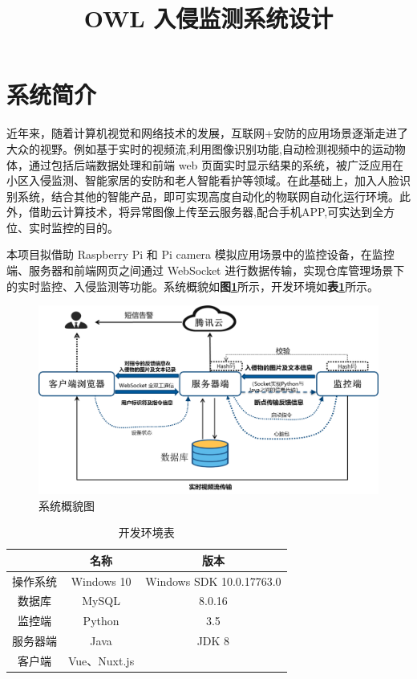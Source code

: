 \documentclass[article]{BJTU-thesis}
\title{OWL 入侵监测系统设计}
\begin{document}
	\makecover
	
	\tableofcontents
	\newpage

	\newpage
	\setcounter{page}{1}
	\section{系统简介}
	近年来，随着计算机视觉和网络技术的发展，互联网+安防的应用场景逐渐走进了大众的视野。例如基于实时的视频流,利用图像识别功能,自动检测视频中的运动物体，通过包括后端数据处理和前端 web 页面实时显示结果的系统，被广泛应用在小区入侵监测、智能家居的安防和老人智能看护等领域。在此基础上，加入人脸识别系统，结合其他的智能产品，即可实现高度自动化的物联网自动化运行环境。此外，借助云计算技术，将异常图像上传至云服务器,配合手机APP,可实达到全方位、实时监控的目的。
	
	本项目拟借助 Raspberry Pi 和 Pi camera 模拟应用场景中的监控设备，在监控端、服务器和前端网页之间通过 WebSocket 进行数据传输，实现仓库管理场景下的实时监控、入侵监测等功能。系统概貌如\textbf{图\ref{fig:fig1}}所示，开发环境如\textbf{表\ref{tab:tab1}}所示。
	
	\begin{figure}[!htb]
		\centering
		\includegraphics[scale=0.6]{img/1.png}
		\caption{系统概貌图}\label{fig:fig1}
	\end{figure}

	\begin{table}[!htbp]
		\centering
		\caption{开发环境表}
		\label{tab:tab1}
		\begin{tabular}{|c|c|c|}
			\hline
			& 名称 & 版本 \\ \hline
			操作系统 & Windows 10 & Windows SDK 10.0.17763.0 \\ \hline
			数据库 & MySQL & 8.0.16 \\ \hline
			监控端 & Python & 3.5 \\ \hline
			服务器端 & Java & JDK 8 \\ \hline
			客户端 & Vue、Nuxt.js &  \\ \hline
		\end{tabular}
	\end{table}
	
\end{document}
